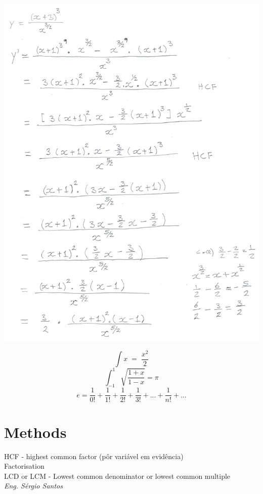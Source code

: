 \begin{minipage}{0.80\linewidth}
	\includegraphics[scale=0.25]{./image/examples/derivativeasy_2.jpg}
\end{minipage}
\newpage
\[\int x \; = \; \frac{x^2}{2}\]
\[\int_{-1}^{1}\sqrt{\frac{1+x}{1-x}}=\pi\]
\[e=\frac{1}{0!}+\frac{1}{1!}+\frac{1}{2!}+\frac{1}{3!}+...+\frac{1}{n!}+...\]

\newpage
\section{Methods}
HCF - highest common factor (pôr variável em evidência) \\
Factorisation \\
LCD or LCM - Lowest common denominator or lowest common multiple \\
\newpage
\normalsize
\null \vfill
\textit{Eng. Sérgio Santos}

